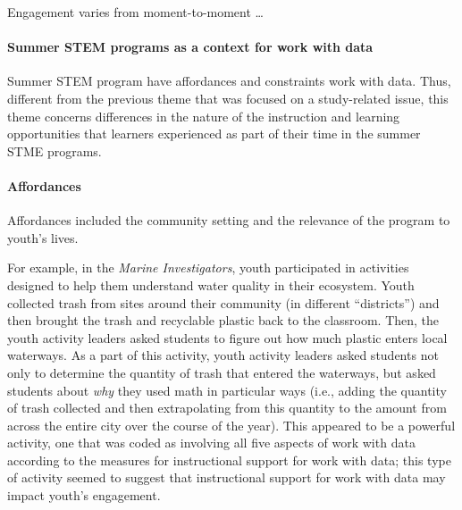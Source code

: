 \documentclass[]{book}
\let\oldparagraph\paragraph
\renewcommand{\paragraph}[1]{\oldparagraph{#1}\mbox{}}
\theoremstyle{definition}
\theoremstyle{definition}
\theoremstyle{definition}
\theoremstyle{remark}
\begin{document}
Engagement varies from moment-to-moment \ldots{}

\paragraph{Summer STEM programs as a context for work with
data}\label{summer-stem-programs-as-a-context-for-work-with-data}

Summer STEM program have affordances and constraints work with data.
Thus, different from the previous theme that was focused on a
study-related issue, this theme concerns differences in the nature of
the instruction and learning opportunities that learners experienced as
part of their time in the summer STME programs.

\paragraph{Affordances}\label{affordances}

Affordances included the community setting and the relevance of the
program to youth's lives.

For example, in the \emph{Marine Investigators}, youth participated in
activities designed to help them understand water quality in their
ecosystem. Youth collected trash from sites around their community (in
different ``districts'') and then brought the trash and recyclable
plastic back to the classroom. Then, the youth activity leaders asked
students to figure out how much plastic enters local waterways. As a
part of this activity, youth activity leaders asked students not only to
determine the quantity of trash that entered the waterways, but asked
students about \emph{why} they used math in particular ways (i.e.,
adding the quantity of trash collected and then extrapolating from this
quantity to the amount from across the entire city over the course of
the year). This appeared to be a powerful activity, one that was coded
as involving all five aspects of work with data according to the
measures for instructional support for work with data; this type of
activity seemed to suggest that instructional support for work with data
may impact youth's engagement.
\end{document}
